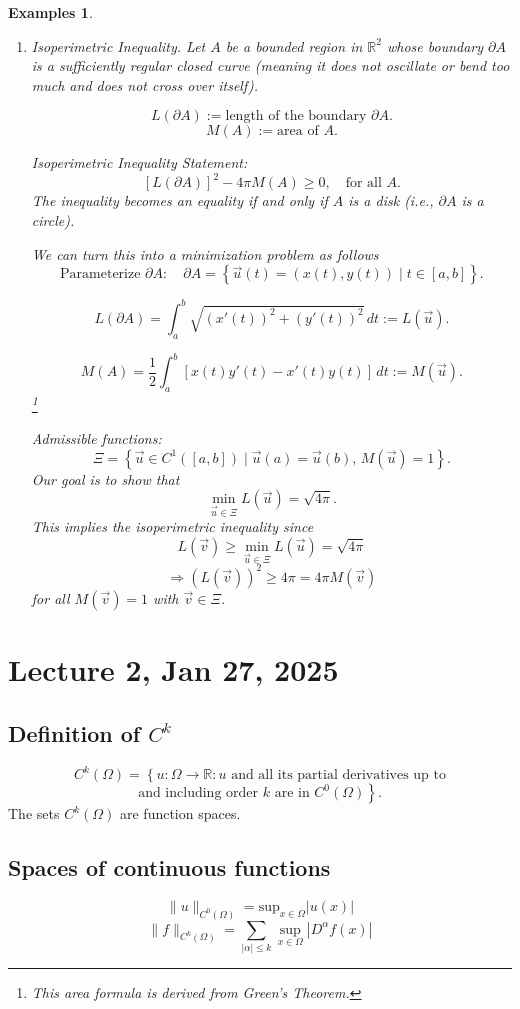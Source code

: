 \documentclass[12pt]{report}
\newtheorem{examples}{Examples}[section]
\begin{document}
\begin{examples}
\begin{enumerate}
\item Isoperimetric Inequality. 
Let \( A \) be a bounded region in \( \mathbb{R}^2 \) whose boundary \( \partial A \) is a sufficiently regular closed curve (meaning it does not oscillate or bend too much and does not cross over itself).

\[
L(\partial A) := \text{length of the boundary } \partial A.
\]
\[
M(A) := \text{area of } A.
\]

\textit{Isoperimetric Inequality Statement:}
\[
[L(\partial A)]^2 - 4\pi M(A) \geq 0, \quad \text{for all } A.
\]
The inequality becomes an equality if and only if \( A \) is a disk (i.e., \( \partial A \) is a circle).

We can turn this into a minimization problem as follows
\[
\text{Parameterize } \partial A: \quad \partial A = \left\{ \vec{u}(t) = (x(t), y(t)) \mid t \in [a, b] \right\}.
\]

\[
L(\partial A) = \int_{a}^{b} \sqrt{(x'(t))^2 + (y'(t))^2} \, dt := L(\vec{u}).
\]

\[
M(A) = \frac{1}{2} \int_{a}^{b} \left[ x(t) y'(t) - x'(t) y(t) \right] \, dt := M(\vec{u}).
\] \footnote{This area formula is derived from Green's Theorem. }

Admissible functions:
\[
\Xi = \left\{ \vec{u} \in C^1([a,b]) \mid \vec{u}(a) = \vec{u}(b), \, M(\vec{u}) = 1 \right\}.
\]
Our goal is to show that 
\[
\min_{\vec{u} \in \Xi} L(\vec{u}) = \sqrt{4\pi}.
\]
This implies the isoperimetric inequality since
\[
L(\vec{v}) \geq \min_{\vec{u} \in \Xi} L(\vec{u}) = \sqrt{4\pi}
\]
\[
\Rightarrow (L(\vec{v}))^2 \geq 4\pi = 4\pi M(\vec{v})
\]
for all \( M(\vec{v}) = 1 \) with \( \vec{v} \in \Xi \).



\end{enumerate}
\end{examples}
\section{Lecture 2, Jan 27, 2025}
\subsection{Definition of \(C^k\)}
\[
C^k(\Omega) = \left\{ u : \Omega \to \mathbb{R} : u \text{ and all its partial derivatives up to} \right.
\]
\[
\left. \text{and including order } k \text{ are in } C^0(\Omega) \right\}.
\]
The sets \( C^k(\Omega) \) are function spaces.
\subsection{Spaces of continuous functions} 
\[\|u\|_{C^0(\Omega)} = \text{sup}_{x \in \Omega} |u(x)|\]
\[\|f\|_{C^k (\Omega)} = \sum_{|\alpha| \leq k} \sup_{x \in \Omega} |D^\alpha f(x)|
 \]
\end{document}
